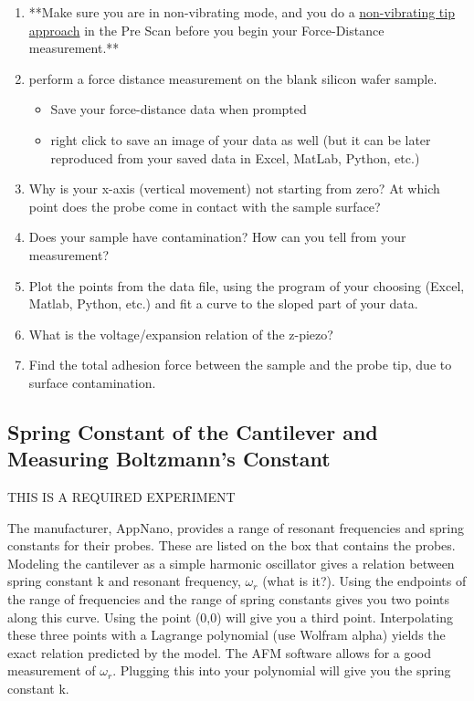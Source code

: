 \documentclass{../lab}
\begin{document}
\begin{enumerate}
    \item **Make sure you are in non-vibrating mode, and you do a \hyperref[subsec:TipApproach]{non-vibrating tip approach} in the Pre Scan before you begin your Force-Distance measurement.**

    \item perform a force distance measurement on the blank silicon wafer sample.

    \begin{itemize}
        \item Save your force-distance data when prompted

        \item right click to save an image of your data as well (but it can be later reproduced from your saved data in Excel, MatLab, Python, etc.)

    \end{itemize}

    \item Why is your x-axis (vertical movement) not starting from zero?  At which point does the probe come in contact with the sample surface?

    \item Does your sample have contamination? How can you tell from your measurement?

    \item Plot the points from the data file, using the program of your choosing (Excel, Matlab, Python, etc.) and fit a curve to the sloped part of your data.

    \item What is the voltage/expansion relation of the z-piezo?

    \item Find the total adhesion force between the sample and the probe tip, due to surface contamination.

\end{enumerate}

\subsection{Spring Constant of the Cantilever and Measuring Boltzmann's Constant}
\label{subsec:Boltzmann}

THIS IS A REQUIRED EXPERIMENT

The manufacturer, AppNano, provides a range of resonant frequencies and spring constants for their probes. These are listed on the box that contains the probes. Modeling the cantilever as a simple harmonic oscillator gives a relation between spring constant k and resonant frequency, $\omega_r$ (what is it?). Using the endpoints of the range of frequencies and the range of spring constants gives you two points along this curve. Using the point (0,0) will give you a third point. Interpolating these three points with a Lagrange polynomial (use Wolfram alpha) yields the exact relation predicted by the model. The AFM software allows for a good measurement of $\omega_r$. Plugging this into your polynomial will give you the spring constant k.
\end{document}
